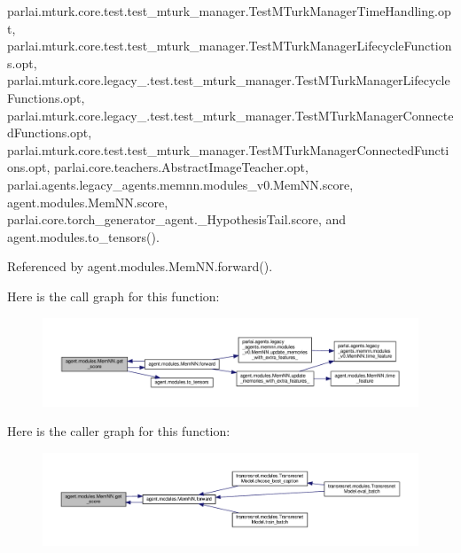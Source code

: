 parlai.\+mturk.\+core.\+test.\+test\+\_\+mturk\+\_\+manager.\+Test\+M\+Turk\+Manager\+Time\+Handling.\+opt, parlai.\+mturk.\+core.\+test.\+test\+\_\+mturk\+\_\+manager.\+Test\+M\+Turk\+Manager\+Lifecycle\+Functions.\+opt, parlai.\+mturk.\+core.\+legacy\+\_.\+test.\+test\+\_\+mturk\+\_\+manager.\+Test\+M\+Turk\+Manager\+Lifecycle\+Functions.\+opt, parlai.\+mturk.\+core.\+legacy\+\_.\+test.\+test\+\_\+mturk\+\_\+manager.\+Test\+M\+Turk\+Manager\+Connected\+Functions.\+opt, parlai.\+mturk.\+core.\+test.\+test\+\_\+mturk\+\_\+manager.\+Test\+M\+Turk\+Manager\+Connected\+Functions.\+opt, parlai.\+core.\+teachers.\+Abstract\+Image\+Teacher.\+opt, parlai.\+agents.\+legacy\+\_\+agents.\+memnn.\+modules\+\_\+v0.\+Mem\+N\+N.\+score, agent.\+modules.\+Mem\+N\+N.\+score, parlai.\+core.\+torch\+\_\+generator\+\_\+agent.\+\_\+\+Hypothesis\+Tail.\+score, and agent.\+modules.\+to\+\_\+tensors().



Referenced by agent.\+modules.\+Mem\+N\+N.\+forward().

Here is the call graph for this function\+:
\nopagebreak
\begin{figure}[H]
\begin{center}
\leavevmode
\includegraphics[width=350pt]{classagent_1_1modules_1_1MemNN_a830d84e09fae11dac5df4cbf8225bd26_cgraph}
\end{center}
\end{figure}
Here is the caller graph for this function\+:
\nopagebreak
\begin{figure}[H]
\begin{center}
\leavevmode
\includegraphics[width=350pt]{classagent_1_1modules_1_1MemNN_a830d84e09fae11dac5df4cbf8225bd26_icgraph}
\end{center}
\end{figure}
\mbox{\label{classagent_1_1modules_1_1MemNN_a1464c9a427996709f4a910a7b2d2487d}} 
